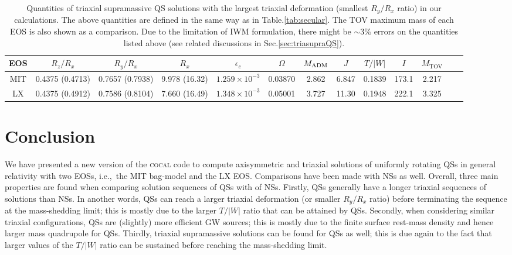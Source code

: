 \documentclass[twocolumn,superscriptaddress,showpacs,prd,aps,amsmath,amssymb,nofootinbib]{revtex4-1}
\newcommand{\cocal}{\textsc{cocal}}
\newcommand{\ie}{i.e.,~}
\begin{document}
\begin{table*}
  \begin{tabular}{ccccccccccccc}
    \hline
    EOS&$R_z/R_x$&$R_y/R_x$&$R_x$&$\epsilon_c$&$\Omega$&$M_{\rm ADM}$&$J$&$T/|W|$&$I$&$M_\mathrm{TOV}$ \\
    \hline
    MIT& 0.4375 (0.4713) & 0.7657 (0.7938) & 9.978	(16.32) & 	$ 1.259 \times 10^{-3} $	 & 	0.03870 & 	2.862 & 	6.847 & 	0.1839  & 	173.1  & 	2.217 & 	 \\
    LX& 0.4375 (0.4912) & 0.7586 (0.8104) & 7.660 (16.49)& 	$1.348 \times 10^{-3} $	 & 	0.05001 & 	3.727 & 	11.30	 & 	0.1948	 & 	222.1	 & 3.325 & 	 	 \\
    \hline
  \end{tabular}
  \caption{Quantities of triaxial supramassive QS solutions with the
    largest triaxial deformation (smallest $R_y/R_x$ ratio) in our
    calculations. The above quantities are defined in the same way as in
    Table.\ref{tab:secular}. The TOV maximum mass of each EOS is also
    shown as a comparison. Due to the limitation of IWM formulation,
    there might be $\sim3\%$ errors on the quantities listed above (see
    related discussions in Sec.\ref{sec:triasupraQS}).
}
\label{tab:triasupraqs}
\end{table*}


\section{Conclusion}
\label{sec:disandconclu}

We have presented a new version of the \cocal{} code to compute
axisymmetric and triaxial solutions of uniformly rotating QSs in general
relativity with two EOSs, \ie the MIT bag-model and the LX EOS.
Comparisons have been made with NSs as well. Overall, three main
properties are found when comparing solution sequences of QSs with of
NSs. Firstly, QSs generally have a longer triaxial
sequences of solutions than NSs. In another words, QSs can reach a larger
triaxial deformation (or smaller $R_y/R_x$ ratio) before terminating the
sequence at the mass-shedding limit; this is mostly due to the larger
$T/|W|$ ratio that can be attained by QSs.  Secondly, when considering
similar triaxial configurations, QSs are (slightly) more efficient GW
sources; this is mostly due to the finite surface rest-mass density and
hence larger mass quadrupole for QSs. Thirdly, triaxial supramassive
solutions can be found for QSs as well; this is due again to the fact
that larger values of the $T/|W|$ ratio can be sustained before reaching
the mass-shedding limit.
\end{document}
